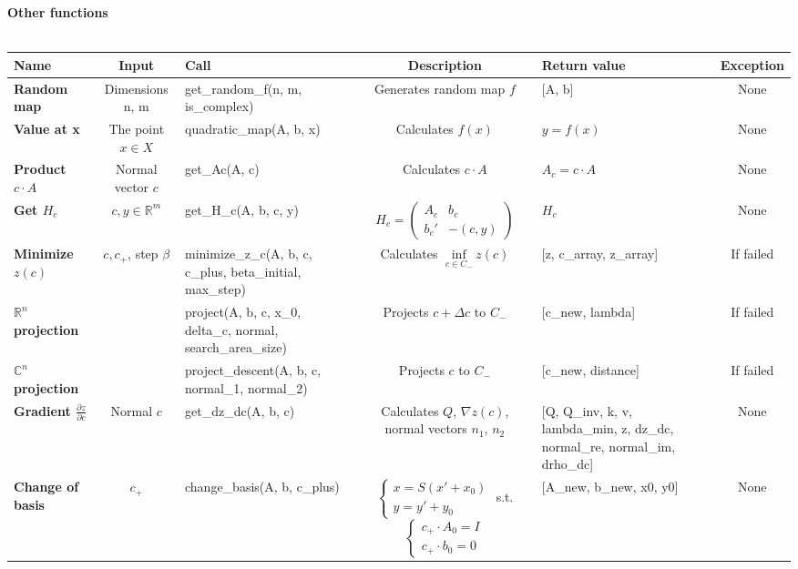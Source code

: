 \documentclass[a4paper]{article}
\newcommand{\R}{\mathbb{R}}
\theoremstyle{definition}
\begin{document}
\begin{landscape}
{\bf Other functions}\\\\
\begin{tabular}{|p{28mm}|c|p{50mm}|c|p{30mm}|c|}
	\hline
	\bf Name & \bf Input & \bf Call & \bf Description & \bf Return value & \bf Exception\\\hline
	\bf Random map & {Dimensions n, m} & get\_random\_f(n, m, is\_complex) & Generates random map $f$ & [A, b] & None\\\hline
	\bf Value at x & The point $x\in X$ & quadratic\_map(A, b, x) & Calculates $f(x)$ & $y=f(x)$ & None\\\hline
	\bf Product $c\cdot A$ & Normal vector $c$ & get\_Ac(A, c) & Calculates $c\cdot A$ & $A_c=c\cdot A$ & None\\\hline
	\bf Get $H_c$ & $c,y\in\R^m$ & get\_H\_c(A, b, c, y) & $H_c=\left(\begin{array}{cc}A_c & b_c\\b_c' &-(c,y) \end{array}\right)$ & $H_c$ & None\\\hline
	\bf Minimize $z(c)$ & $c,c_+$, step $\beta$ & minimize\_z\_c(A, b, c, c\_plus, beta\_initial, max\_step) & Calculates $\inf\limits_{c\in C_-}z(c)$ & [z, c\_array, z\_array] & If failed\\\hline
	\bf  $\R^n$ projection & & project(A, b, c, x\_0, delta\_c, normal, search\_area\_size) & Projects $c+\Delta c$ to $C_-$ & [c\_new, lambda] & If failed\\\hline
	\bf $\mathbb{C}^n$ projection & & project\_descent(A, b, c, normal\_1, normal\_2) & Projects $c$ to $C_-$ & [c\_new, distance] & If failed\\\hline
	\bf Gradient $\frac{\partial z}{\partial c}$ & Normal $c$ & get\_dz\_dc(A, b, c) & Calculates $Q$, $\nabla z(c)$, normal vectors $n_1$, $n_2$ & [Q, Q\_inv, k, v, lambda\_min, z, dz\_dc, normal\_re, normal\_im, drho\_dc] & None\\\hline
	\bf Change of basis & $c_+$ & change\_basis(A, b, c\_plus) & $\begin{cases}
	x = S(x'+x_0)\\
	y = y' + y_0
	\end{cases}
	$ s.t.
	$\begin{cases}
	c_+\cdot A_0=I\\
	c_+\cdot b_0=0
	\end{cases}$ & [A\_new, b\_new, x0, y0] & None\\\hline
\end{tabular}
\end{landscape}
\end{document}
